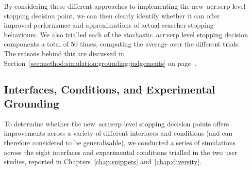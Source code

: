 By considering these different approaches to implementing the new~\gls{acr:serp} level stopping decision point, we can then clearly identify whether it can offer improved performance and approximations of actual searcher stopping behaviours. We also trialled each of the stochastic~\gls{acr:serp} level stopping decision components a total of 50 times, computing the average over the different trials. The reasons behind this are discussed in Section~\ref{sec:method:simulation:grounding:judgements} on page~\pageref{sec:method:simulation:grounding:judgements}.

\subsection{Interfaces, Conditions, and Experimental Grounding}\label{sec:serp:method:probscosts}
To determine whether the new~\gls{acr:serp} level stopping decision points offers improvements across a variety of different interfaces and conditions (and can therefore considered to be generalisable), we conducted a series of simulations across the eight interfaces and experimental conditions trialled in the two user studies, reported in Chapters~\ref{chap:snippets} and~\ref{chap:diversity}.

